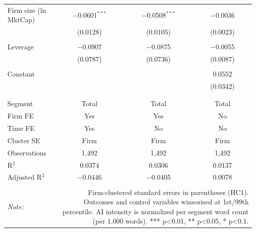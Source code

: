 \begin{table}[!htbp]
\begin{tabular}{@{\extracolsep{5pt}}lccc}
 Firm size (ln MktCap) & $-$0.0601$^{***}$ & $-$0.0508$^{***}$ & $-$0.0036 \\ 
  & (0.0128) & (0.0105) & (0.0023) \\ 
  & & & \\ 
 Leverage & $-$0.0907 & $-$0.0875 & $-$0.0055 \\ 
  & (0.0787) & (0.0736) & (0.0087) \\ 
  & & & \\ 
 Constant &  &  & 0.0552 \\ 
  &  &  & (0.0342) \\ 
  & & & \\ 
\hline \\[-1.8ex] 
Segment & Total & Total & Total \\ 
Firm FE & Yes & Yes & No \\ 
Time FE & Yes & No & No \\ 
Cluster SE & Firm & Firm & Firm \\ 
Observations & 1,492 & 1,492 & 1,492 \\ 
R$^{2}$ & 0.0374 & 0.0306 & 0.0137 \\ 
Adjusted R$^{2}$ & $-$0.0446 & $-$0.0405 & 0.0078 \\ 
\hline 
\hline \\[-1.8ex] 
\textit{Note:}  & \multicolumn{3}{r}{Firm-clustered standard errors in parentheses (HC1). Outcomes and control variables winsorised at 1st/99th percentile. AI intensity is normalized per segment word count (per 1,000 words). *** p<0.01, ** p<0.05, * p<0.1.} \\ 
\end{tabular} 
\end{table} 
